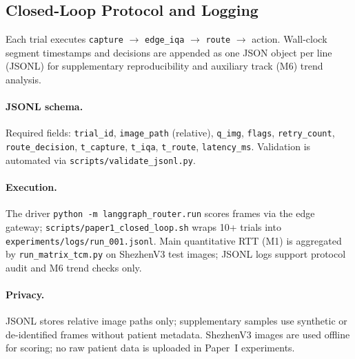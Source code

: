 \subsection{Closed-Loop Protocol and Logging}
\label{sec:closed-loop}

Each trial executes \texttt{capture} $\rightarrow$ \texttt{edge\_iqa} $\rightarrow$ \texttt{route} $\rightarrow$ action. Wall-clock segment timestamps and decisions are appended as one JSON object per line (JSONL) for supplementary reproducibility and auxiliary track (M6) trend analysis.

\paragraph{JSONL schema.}
Required fields: \texttt{trial\_id}, \texttt{image\_path} (relative), \texttt{q\_img}, \texttt{flags}, \texttt{retry\_count}, \texttt{route\_decision}, \texttt{t\_capture}, \texttt{t\_iqa}, \texttt{t\_route}, \texttt{latency\_ms}. Validation is automated via \texttt{scripts/validate\_jsonl.py}.

\paragraph{Execution.}
The driver \texttt{python -m langgraph\_router.run} scores frames via the edge gateway; \texttt{scripts/paper1\_closed\_loop.sh} wraps 10+ trials into \texttt{experiments/logs/run\_001.jsonl}.
Main quantitative RTT (M1) is aggregated by \texttt{run\_matrix\_tcm.py} on ShezhenV3 test images; JSONL logs support protocol audit and M6 trend checks only.

\paragraph{Privacy.}
JSONL stores relative image paths only; supplementary samples use synthetic or de-identified frames without patient metadata.
ShezhenV3 images are used offline for scoring; no raw patient data is uploaded in Paper~I experiments.

\begin{table}[t]
\centering
\caption{Closed-loop JSONL fields (Paper~I).}
\small
{}
\end{table}
